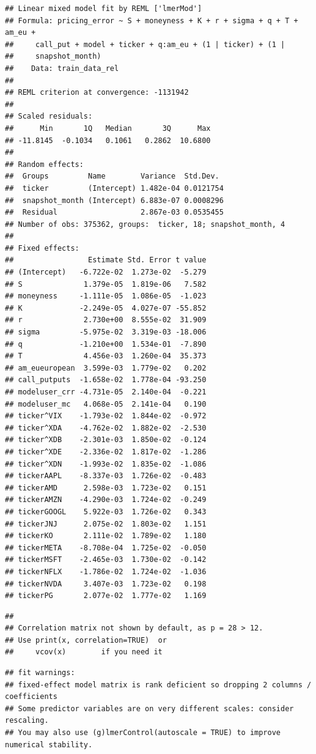\documentclass[
]{article}
\begin{document}
\begin{verbatim}
## Linear mixed model fit by REML ['lmerMod']
## Formula: pricing_error ~ S + moneyness + K + r + sigma + q + T + am_eu +  
##     call_put + model + ticker + q:am_eu + (1 | ticker) + (1 |  
##     snapshot_month)
##    Data: train_data_rel
## 
## REML criterion at convergence: -1131942
## 
## Scaled residuals: 
##      Min       1Q   Median       3Q      Max 
## -11.8145  -0.1034   0.1061   0.2862  10.6800 
## 
## Random effects:
##  Groups         Name        Variance  Std.Dev. 
##  ticker         (Intercept) 1.482e-04 0.0121754
##  snapshot_month (Intercept) 6.883e-07 0.0008296
##  Residual                   2.867e-03 0.0535455
## Number of obs: 375362, groups:  ticker, 18; snapshot_month, 4
## 
## Fixed effects:
##                 Estimate Std. Error t value
## (Intercept)   -6.722e-02  1.273e-02  -5.279
## S              1.379e-05  1.819e-06   7.582
## moneyness     -1.111e-05  1.086e-05  -1.023
## K             -2.249e-05  4.027e-07 -55.852
## r              2.730e+00  8.555e-02  31.909
## sigma         -5.975e-02  3.319e-03 -18.006
## q             -1.210e+00  1.534e-01  -7.890
## T              4.456e-03  1.260e-04  35.373
## am_eueuropean  3.599e-03  1.779e-02   0.202
## call_putputs  -1.658e-02  1.778e-04 -93.250
## modeluser_crr -4.731e-05  2.140e-04  -0.221
## modeluser_mc   4.068e-05  2.141e-04   0.190
## ticker^VIX    -1.793e-02  1.844e-02  -0.972
## ticker^XDA    -4.762e-02  1.882e-02  -2.530
## ticker^XDB    -2.301e-03  1.850e-02  -0.124
## ticker^XDE    -2.336e-02  1.817e-02  -1.286
## ticker^XDN    -1.993e-02  1.835e-02  -1.086
## tickerAAPL    -8.337e-03  1.726e-02  -0.483
## tickerAMD      2.598e-03  1.723e-02   0.151
## tickerAMZN    -4.290e-03  1.724e-02  -0.249
## tickerGOOGL    5.922e-03  1.726e-02   0.343
## tickerJNJ      2.075e-02  1.803e-02   1.151
## tickerKO       2.111e-02  1.789e-02   1.180
## tickerMETA    -8.708e-04  1.725e-02  -0.050
## tickerMSFT    -2.465e-03  1.730e-02  -0.142
## tickerNFLX    -1.786e-02  1.724e-02  -1.036
## tickerNVDA     3.407e-03  1.723e-02   0.198
## tickerPG       2.077e-02  1.777e-02   1.169
\end{verbatim}

\begin{verbatim}
## 
## Correlation matrix not shown by default, as p = 28 > 12.
## Use print(x, correlation=TRUE)  or
##     vcov(x)        if you need it
\end{verbatim}

\begin{verbatim}
## fit warnings:
## fixed-effect model matrix is rank deficient so dropping 2 columns / coefficients
## Some predictor variables are on very different scales: consider rescaling. 
## You may also use (g)lmerControl(autoscale = TRUE) to improve numerical stability.
\end{verbatim}
\end{document}
